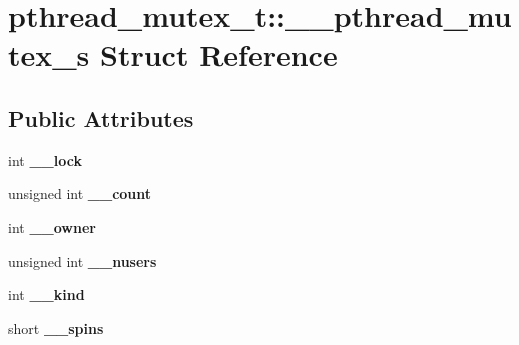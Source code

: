 \hypertarget{structpthread__mutex__t_1_1____pthread__mutex__s}{\section{pthread\+\_\+mutex\+\_\+t\+:\+:\+\_\+\+\_\+pthread\+\_\+mutex\+\_\+s Struct Reference}
\label{structpthread__mutex__t_1_1____pthread__mutex__s}
}
\subsection*{Public Attributes}
\begin{DoxyCompactItemize}
\item 
\hypertarget{structpthread__mutex__t_1_1____pthread__mutex__s_a972204bdaeec88b14936af6937ab180c}{int {\bfseries \+\_\+\+\_\+lock}}\label{structpthread__mutex__t_1_1____pthread__mutex__s_a972204bdaeec88b14936af6937ab180c}

\item 
\hypertarget{structpthread__mutex__t_1_1____pthread__mutex__s_aeda8c6bdd0a01696872e421c097b96ee}{unsigned int {\bfseries \+\_\+\+\_\+count}}\label{structpthread__mutex__t_1_1____pthread__mutex__s_aeda8c6bdd0a01696872e421c097b96ee}

\item 
\hypertarget{structpthread__mutex__t_1_1____pthread__mutex__s_a5bd4dae0b96d3429e476831c38cfa59d}{int {\bfseries \+\_\+\+\_\+owner}}\label{structpthread__mutex__t_1_1____pthread__mutex__s_a5bd4dae0b96d3429e476831c38cfa59d}

\item 
\hypertarget{structpthread__mutex__t_1_1____pthread__mutex__s_afd062054026846354e4827648cf050b3}{unsigned int {\bfseries \+\_\+\+\_\+nusers}}\label{structpthread__mutex__t_1_1____pthread__mutex__s_afd062054026846354e4827648cf050b3}

\item 
\hypertarget{structpthread__mutex__t_1_1____pthread__mutex__s_a2a6cdc833e69946caa82a0412fadf096}{int {\bfseries \+\_\+\+\_\+kind}}\label{structpthread__mutex__t_1_1____pthread__mutex__s_a2a6cdc833e69946caa82a0412fadf096}

\item 
\hypertarget{structpthread__mutex__t_1_1____pthread__mutex__s_acb3d6e5387bf923cd749d7beab6574f0}{short {\bfseries \+\_\+\+\_\+spins}}\label{structpthread__mutex__t_1_1____pthread__mutex__s_acb3d6e5387bf923cd749d7beab6574f0}


\end{DoxyCompactItemize}
